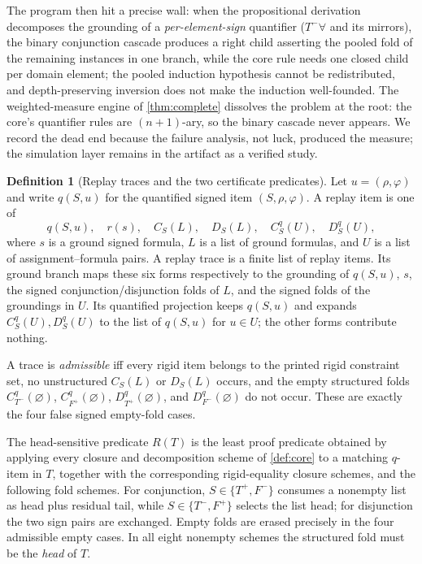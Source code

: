 \documentclass[11pt,a4paper]{article}
\theoremstyle{definition}
\newtheorem{definition}[theorem]{Definition}
\newcommand{\Tp}{T^{+}}\newcommand{\Tm}{T^{-}}
\newcommand{\Fp}{F^{+}}\newcommand{\Fm}{F^{-}}
\begin{document}
The program then hit a precise wall: when the propositional derivation
decomposes the grounding of a \emph{per-element-sign} quantifier
($\Tm\forall$ and its mirrors), the binary conjunction cascade produces a
right child asserting the pooled fold of the remaining instances in one
branch, while the core rule needs one closed child per domain element;
the pooled induction hypothesis cannot be redistributed, and
depth-preserving inversion does not make the induction well-founded. The
weighted-measure engine of \cref{thm:complete} dissolves the problem at
the root: the core's quantifier rules are $(n{+}1)$-ary, so the binary
cascade never appears. We record the dead end because the failure
analysis, not luck, produced the measure; the simulation layer remains in
the artifact as a verified study.

\begin{definition}[Replay traces and the two certificate predicates]
\label{def:replay}
Let $u=(\rho,\varphi)$ and write $q(S,u)$ for the quantified signed item
$(S,\rho,\varphi)$. A replay item is one of
\[
 q(S,u),\quad r(s),\quad C_S(L),\quad D_S(L),\quad
 C^q_S(U),\quad D^q_S(U),
\]
where $s$ is a ground signed formula, $L$ is a list of ground formulas,
and $U$ is a list of assignment--formula pairs. A replay trace is a finite
list of replay items. Its ground branch maps these six forms respectively to
the grounding of $q(S,u)$, $s$, the signed conjunction/disjunction folds of
$L$, and the signed folds of the groundings in $U$. Its quantified
projection keeps $q(S,u)$ and expands $C^q_S(U),D^q_S(U)$ to the list of
$q(S,u)$ for $u\in U$; the other forms contribute nothing.

A trace is \emph{admissible} iff every rigid item belongs to the printed rigid
constraint set, no unstructured $C_S(L)$ or $D_S(L)$ occurs, and the empty
structured folds $C^q_{\Tm}(\varnothing)$,
$C^q_{\Fp}(\varnothing)$, $D^q_{\Tp}(\varnothing)$, and
$D^q_{\Fm}(\varnothing)$ do not occur. These are exactly the four false
signed empty-fold cases.

The head-sensitive predicate $R(T)$ is the least proof predicate obtained by
applying every closure and decomposition scheme of \cref{def:core} to a
matching $q$-item in $T$, together with the corresponding rigid-equality
closure schemes, and the following fold schemes. For conjunction,
$S\in\{\Tp,\Fm\}$ consumes a nonempty list as head plus residual tail, while
$S\in\{\Tm,\Fp\}$ selects the list head; for disjunction the two sign pairs
are exchanged. Empty folds are erased precisely in the four admissible empty
cases. In all eight nonempty schemes the structured fold must be the
\emph{head} of $T$.


\end{definition}
\end{document}

